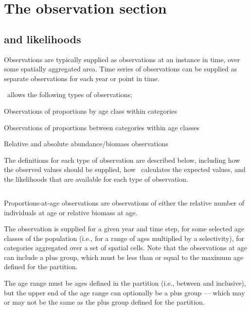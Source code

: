 \section{The observation section\label{sec:observation-section}}

\subsection{ and likelihoods\label{sec:likelihoods}}

Observations are typically supplied as observations at an instance in time, over some spatially aggregated area. Time series of observations can be supplied as separate observations for each year or point in time. 

\SPM\ allows the following types of observations;

\begin{description}
  \item Observations of proportions by age class within categories
  \item Observations of proportions between categories within age classes
  \item Relative and absolute abundance/biomass observations
\end{description}

The definitions for each type of observation are described below, including how the observed values should be supplied, how \SPM\ calculates the expected values, and the likelihoods that are available for each type of observation.

\subsection{}

Proportions-at-age observations are observations of either the relative number of individuals at age or relative biomass at age. 

The observation is supplied for a given year and time step, for some selected age classes of the population (i.e., for a range of ages multiplied by a selectivity), for categories aggregated over a set of spatial cells. Note that the observations at age can include a plus group, which must be less than or equal to the maximum age defined for the partition.

The age range must be ages defined in the partition (i.e., between  and  inclusive), but the upper end of the age range can optionally be a plus group --- which may or may not be the same as the plus group defined for the partition. 

